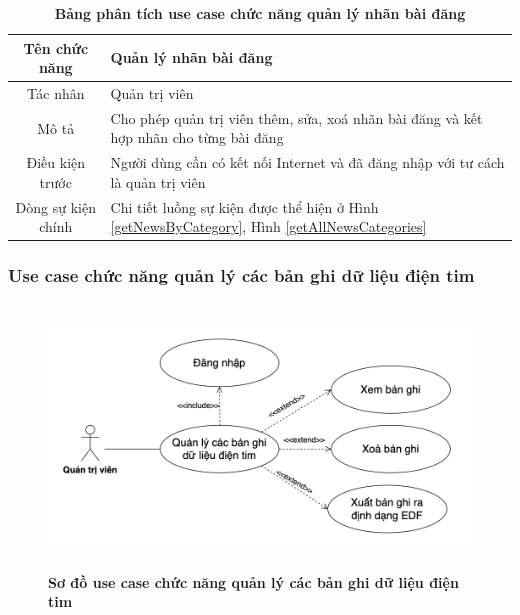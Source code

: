   \begin{table}[H]
    \caption{\bfseries \fontsize{12pt}{0pt}\selectfont Bảng phân tích use case chức năng quản lý nhãn bài đăng}
    \centering
    \begin{tabularx}{0.9\textwidth}{|c|X|}
      \hline
      \textbf{Tên chức năng} & \textbf{Quản lý nhãn bài đăng} \\
      \hline
      Tác nhân & Quản trị viên \\
      \hline
      Mô tả & Cho phép quản trị viên thêm, sửa, xoá nhãn bài đăng và kết hợp nhãn cho từng bài đăng \\
      \hline
      Điều kiện trước & Người dùng cần có kết nối Internet và đã đăng nhập với tư cách là quản trị viên \\
      \hline
      Dòng sự kiện chính & 
        Chi tiết luồng sự kiện được thể hiện ở Hình \ref{getNewsByCategory}, Hình \ref{getAllNewsCategories}\\
      \hline
    \end{tabularx}
  \end{table}

\subsubsection{Use case chức năng quản lý các bản ghi dữ liệu điện tim}
  \begin{figure}[H]
    \centering
    \includegraphics[width=15cm,height=7cm]{Images/use_case/use_case_manage_records.png}
    \caption[Sơ đồ use case chức năng quản lý các bản ghi dữ liệu điện tim]{\bfseries \fontsize{12pt}{0pt}
    \selectfont Sơ đồ use case chức năng quản lý các bản ghi dữ liệu điện tim}
    \label{use_case_manage_records} %
  \end{figure}


